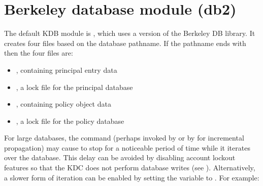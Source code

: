 \documentclass[letterpaper,10pt,english]{sphinxmanual}
\begin{document}
\section{Berkeley database module (db2)}
\label{\detokenize{admin/dbtypes:berkeley-database-module-db2}}
\sphinxAtStartPar
The default KDB module is , which uses a version of the
Berkeley DB library.  It creates four files based on the database
pathname.  If the pathname ends with  then the four files
are:
\begin{itemize}
\item {} 
\sphinxAtStartPar
{}, containing principal entry data

\item {} 
\sphinxAtStartPar
{}, a lock file for the principal database

\item {} 
\sphinxAtStartPar
{}, containing policy object data

\item {} 
\sphinxAtStartPar
{}, a lock file for the policy database

\end{itemize}

\sphinxAtStartPar
For large databases, the {\hyperref[\detokenize{admin/admin_commands/kdb5_util:kdb5-util-8}]{}}  command (perhaps
invoked by {\hyperref[\detokenize{admin/admin_commands/kprop:kprop-8}]{}} or by {\hyperref[\detokenize{admin/admin_commands/kadmind:kadmind-8}]{}} for incremental
propagation) may cause {\hyperref[\detokenize{admin/admin_commands/krb5kdc:krb5kdc-8}]{}} to stop for a noticeable
period of time while it iterates over the database.  This delay can be
avoided by disabling account lockout features so that the KDC does not
perform database writes (see {\hyperref[\detokenize{admin/lockout:disable-lockout}]{}}).  Alternatively,
a slower form of iteration can be enabled by setting the
 variable to .  For example:

\begin{sphinxVerbatim}[commandchars=\\\{\}]
\PYG{p}{[}\PYG{p}{]}
      
          
          
\end{sphinxVerbatim}
\end{document}
